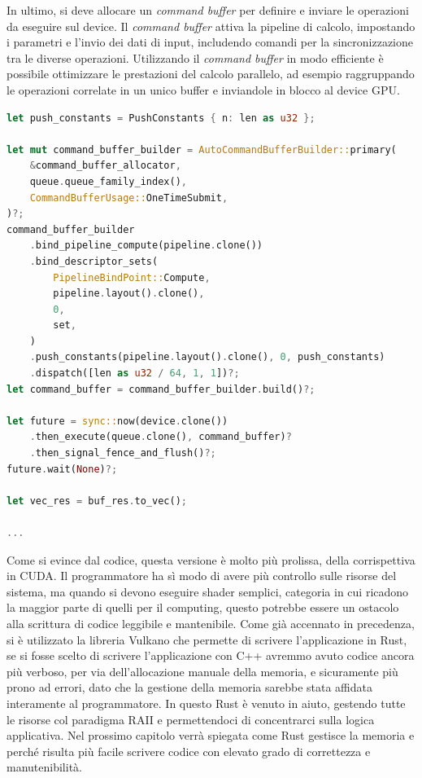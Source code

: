 In ultimo, si deve allocare un \textit{command buffer} per definire e inviare le operazioni da eseguire sul device. Il \textit{command buffer} attiva la pipeline di calcolo, impostando i parametri e l'invio dei dati di input, includendo comandi per la sincronizzazione tra le diverse operazioni. Utilizzando il \textit{command buffer} in modo efficiente è possibile ottimizzare le prestazioni del calcolo parallelo, ad esempio raggruppando le operazioni correlate in un unico buffer e inviandole in blocco al device GPU.

\vspace{5mm}
\begin{lstlisting}[language=Rust, caption=Command buffer e dispatch, label=lis:vulkan_dispatch]
let push_constants = PushConstants { n: len as u32 };

let mut command_buffer_builder = AutoCommandBufferBuilder::primary(
    &command_buffer_allocator,
    queue.queue_family_index(),
    CommandBufferUsage::OneTimeSubmit,
)?;
command_buffer_builder
    .bind_pipeline_compute(pipeline.clone())
    .bind_descriptor_sets(
        PipelineBindPoint::Compute,
        pipeline.layout().clone(),
        0,
        set,
    )
    .push_constants(pipeline.layout().clone(), 0, push_constants)
    .dispatch([len as u32 / 64, 1, 1])?;
let command_buffer = command_buffer_builder.build()?;

let future = sync::now(device.clone())
    .then_execute(queue.clone(), command_buffer)?
    .then_signal_fence_and_flush()?;
future.wait(None)?;

let vec_res = buf_res.to_vec();

...
\end{lstlisting}
\vspace{5mm}

Come si evince dal codice, questa versione è molto più prolissa, della corrispettiva in CUDA. Il programmatore ha sì modo di avere più controllo sulle risorse del sistema, ma quando si devono eseguire shader semplici, categoria in cui ricadono la maggior parte di quelli per il computing, questo potrebbe essere un ostacolo alla scrittura di codice leggibile e mantenibile. Come già accennato in precedenza, si è utilizzato la libreria Vulkano che permette di scrivere l'applicazione in Rust, se si fosse scelto di scrivere l'applicazione con C++ avremmo avuto codice ancora più verboso, per via dell'allocazione manuale della memoria, e sicuramente più prono ad errori, dato che la gestione della memoria sarebbe stata affidata interamente al programmatore. In questo Rust è venuto in aiuto, gestendo tutte le risorse col paradigma RAII e permettendoci di concentrarci sulla logica applicativa. Nel prossimo capitolo verrà spiegata come  Rust gestisce la memoria e perché risulta più facile scrivere codice con elevato grado di correttezza e manutenibilità.


